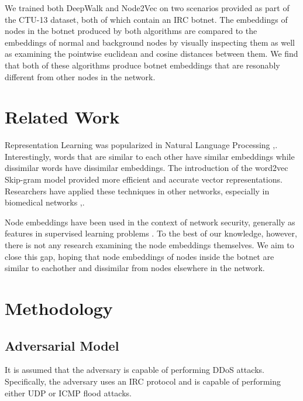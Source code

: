 \documentclass[10pt]{article}
\begin{document}
\begin{multicols}{2}
We trained both DeepWalk and Node2Vec on two scenarios provided as part of the CTU-13 dataset, both of which contain an IRC botnet. The embeddings of nodes in the botnet produced by both algorithms are compared to the embeddings of normal and background nodes by visually inspecting them as well as examining the pointwise euclidean and cosine distances between them. We find that both of these algorithms produce botnet embeddings that are resonably different from other nodes in the network. 

\section{Related Work}

Representation Learning was popularized in Natural Language Processing \cite{Camacho},\cite{Madelbaum}. Interestingly, words that are similar to each other have similar embeddings while dissimilar words have dissimilar embeddings. The introduction of the word2vec Skip-gram model \cite{Mikolov} provided more efficient and accurate vector representations.  Researchers have applied these techniques in other networks, especially in biomedical networks \cite{Perkins},\cite{Yue}.

Node embeddings have been used in the context of network security, generally as features in supervised learning problems \cite{Skorniakov}. To the best of our knowledge, however, there is not any research examining the node embeddings themselves. We aim to close this gap, hoping that node embeddings of nodes inside the botnet are similar to eachother and dissimilar from nodes elsewhere in the network.

\section{Methodology}

\subsection{Adversarial Model}
It is assumed that the adversary is capable of performing DDoS attacks. Specifically, the adversary uses an IRC protocol and is capable of performing either UDP or ICMP flood attacks.



\end{multicols}
\end{document}

